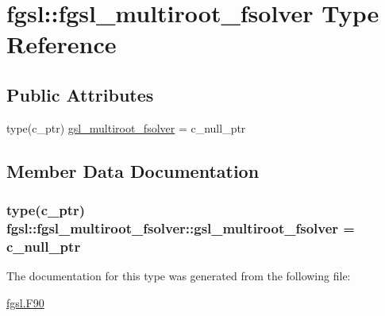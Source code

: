 \hypertarget{structfgsl_1_1fgsl__multiroot__fsolver}{\section{fgsl\-:\-:fgsl\-\_\-multiroot\-\_\-fsolver Type Reference}
\label{structfgsl_1_1fgsl__multiroot__fsolver}
}
\subsection*{Public Attributes}
\begin{DoxyCompactItemize}
\item 
type(c\-\_\-ptr) \hyperlink{structfgsl_1_1fgsl__multiroot__fsolver_aa18e9ead08f58d7a72b39524c0fe9bc5}{gsl\-\_\-multiroot\-\_\-fsolver} = c\-\_\-null\-\_\-ptr
\end{DoxyCompactItemize}


\subsection{Member Data Documentation}
\hypertarget{structfgsl_1_1fgsl__multiroot__fsolver_aa18e9ead08f58d7a72b39524c0fe9bc5}{
\subsubsection[{gsl\-\_\-multiroot\-\_\-fsolver}]{\setlength{\rightskip}{0pt plus 5cm}type(c\-\_\-ptr) fgsl\-::fgsl\-\_\-multiroot\-\_\-fsolver\-::gsl\-\_\-multiroot\-\_\-fsolver = c\-\_\-null\-\_\-ptr}}\label{structfgsl_1_1fgsl__multiroot__fsolver_aa18e9ead08f58d7a72b39524c0fe9bc5}


The documentation for this type was generated from the following file\-:\begin{DoxyCompactItemize}
\item 
\hyperlink{fgsl_8F90}{fgsl.\-F90}\end{DoxyCompactItemize}
